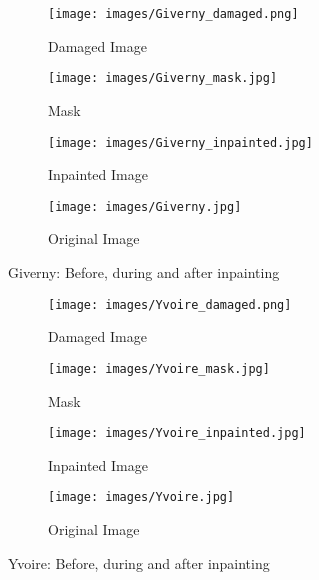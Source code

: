 \begin{figure}[htbp]
    \centering 
    \begin{minipage}{0.8\textwidth} 
        \centering 
        
        \begin{subfigure}[b]{0.45\linewidth} 
            \texttt{[image: images/Giverny\_damaged.png]}
            \caption{Damaged Image}
        \end{subfigure}
        \hfill
        \begin{subfigure}[b]{0.45\linewidth}
            \texttt{[image: images/Giverny\_mask.jpg]}
            \caption{Mask}
        \end{subfigure}

        \vspace{0.5cm}
        \begin{subfigure}[b]{0.45\linewidth}
            \texttt{[image: images/Giverny\_inpainted.jpg]}
            \caption{Inpainted Image}
        \end{subfigure}
        \hfill
        \begin{subfigure}[b]{0.45\linewidth}
            \texttt{[image: images/Giverny.jpg]}
            \caption{Original Image}
        \end{subfigure}

        \caption{Giverny: Before, during and after inpainting}
        \label{fig:Giverny}
    \end{minipage}
\end{figure}

\begin{figure}[htbp]
    \centering 
    \begin{minipage}{0.8\textwidth} 
        \centering 
        
        \begin{subfigure}[b]{0.45\linewidth} 
            \texttt{[image: images/Yvoire\_damaged.png]}
            \caption{Damaged Image}
        \end{subfigure}
        \hfill
        \begin{subfigure}[b]{0.45\linewidth}
            \texttt{[image: images/Yvoire\_mask.jpg]}
            \caption{Mask}
        \end{subfigure}

        \vspace{0.5cm}
        \begin{subfigure}[b]{0.45\linewidth}
            \texttt{[image: images/Yvoire\_inpainted.jpg]}
            \caption{Inpainted Image}
        \end{subfigure}
        \hfill
        \begin{subfigure}[b]{0.45\linewidth}
            \texttt{[image: images/Yvoire.jpg]}
            \caption{Original Image}
        \end{subfigure}

        \caption{Yvoire: Before, during and after inpainting}
        \label{fig:Yvoire}
    \end{minipage}
\end{figure}


